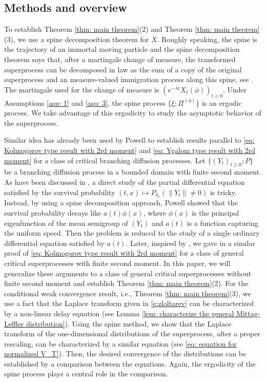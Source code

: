 \documentclass[12pt,a4paper]{amsart}
\theoremstyle{definition}
\numberwithin{equation}{section}
\begin{document}
\subsection{Methods and overview}
	
To establish Theorem \ref{thm: main theorem}(2) and Theorem \ref{thm: main theorem}(3), we use a spine decomposition theorem for 	$X$.
  Roughly speaking, the spine is the trajectory of an immortal moving particle and the spine decomposition theorem says that, after a martingale change of measure, the transformed superprocess can be decomposed in law as the sum of a copy of the original superprocess and an measure-valued immigration process along this spine, see \cite{EckhoffKyprianouWinkel2015Spines, EnglanderKyprianou2004Local, LiuRenSong2009Llog}.
The martingale used for the change of measure is $(e^{-\lambda t} X_t(\phi))_{t\geq 0}$.
Under Assumptions \ref{asp: 1} and \ref{asp: 3}, the spine process $\{\xi; \Pi^{(\phi)}\}$ is an ergodic process.
We take advantage of this ergodicity to study the asymptotic behavior of the superprocess.
	
Similar idea has already been used by Powell \cite{Powell2015An-invariance} to establish results parallel to \eqref{eq: Kolmogorov type result with 2rd moment} and \eqref{eq: Ygalom type result with 2rd moment} for a class of critical branching diffusion processes.
Let $\{(Y_t)_{t\geq 0}; P\}$ be a branching diffusion process in a bounded domain with finite second moment.
As have been discussed in \cite{Powell2015An-invariance}, a direct study of the partial differential equation satisfied by the survival probability $(t,x) \mapsto P_{\delta_x}(\|Y_t\| \neq 0)$ is tricky.
Instead, by using a spine decomposition approach, Powell \cite{Powell2015An-invariance} showed that the survival probability decays like $a(t)\phi(x)$, where $\phi(x)$ is the principal eigenfunction of the mean semigroup of $(Y_t)$ and $a(t)$ is a function capturing the uniform speed.
Then the problem is reduced to the study of a single ordinary differential equation satisfied by $a(t)$.
Later, inspired by \cite{Powell2015An-invariance}, we gave in \cite{RenSongSun2017Spine} a similar proof of \eqref{eq: Kolmogorov type result with 2rd moment} for a class of general critical superprocesses with finite second moment.
In this paper, we will  generalize these arguments to a class of general critical superprocesses without finite second moment and establish Theorem \ref{thm: main theorem}(2).
For the conditional weak convergence result, i.e., Theorem \ref{thm: main theorem}(3), we use a fact that the Laplace transform given in \eqref{e:zloltarev} can be characterized by a non-linear delay equation (see Lemma \ref{lem: characterize the general Mittag-Leffler distribution}).
Using the spine method, we show that the Laplace transform of the one-dimensional distributions of the superprocess, after a proper rescaling, can be 	characterized by a similar equation (see \eqref{eq: equation for normalized V_T}).
Then, the desired convergence of the distributions can be established by a comparison between the equations.	
Again, the ergodicity of the spine process plays a central role in the comparison.
	
\end{document}
